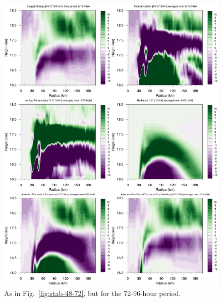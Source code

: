 \documentclass{ametsoc}
\begin{document}
\begin{figure}[ht]
\centerline{\includegraphics[width=33pc]{figures/fig08_h072-h096-budgetterms.png}}
\caption{As in Fig.~\ref{fig:stab-48-72}, but for the 72-96-hour period.}
\label{fig:stab-72-96}
\end{figure}
\end{document}
